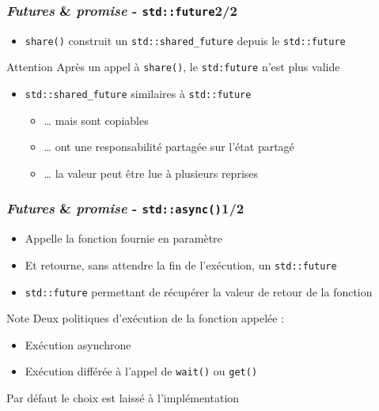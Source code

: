 \documentclass[C++.tex]{subfiles}
\begin{document}
\begin{frame}[fragile]
	\frametitle{\textit{Futures} \& \textit{promise} - \lstinline|std::future|\titlehfill{}2/2}
	\begin{itemize}
		\item \lstinline|share()| construit un \lstinline|std::shared_future| depuis le \lstinline|std::future|
	\end{itemize}

	\begin{alertblock}{Attention}
		Après un appel à \lstinline|share()|, le \lstinline|std:future| n'est plus valide
	\end{alertblock}

	\begin{itemize}
		\item \lstinline|std::shared_future| similaires à \lstinline|std::future|
		\begin{itemize}
			\item \ldots{} mais sont copiables
			\item \ldots{} ont une responsabilité partagée sur l'état partagé
			\item \ldots{} la valeur peut être lue à plusieurs reprises
		\end{itemize}
	\end{itemize}
\end{frame}

\begin{frame}[fragile]
	\frametitle{\textit{Futures} \& \textit{promise} - \lstinline|std::async()|\titlehfill{}1/2}
	\begin{itemize}
		\item Appelle la fonction fournie en paramètre
		\item Et retourne, sans attendre la fin de l'exécution, un \lstinline|std::future|
		\item \lstinline|std::future| permettant de récupérer la valeur de retour de la fonction
	\end{itemize}

	\begin{block}{Note}
		Deux politiques d'exécution de la fonction appelée :
		\begin{itemize}
			\item Exécution asynchrone
			\item Exécution différée à l'appel de \lstinline|wait()| ou \lstinline|get()|
		\end{itemize}
		Par défaut le choix est laissé à l'implémentation
	\end{block}
\end{frame}
\end{document}
